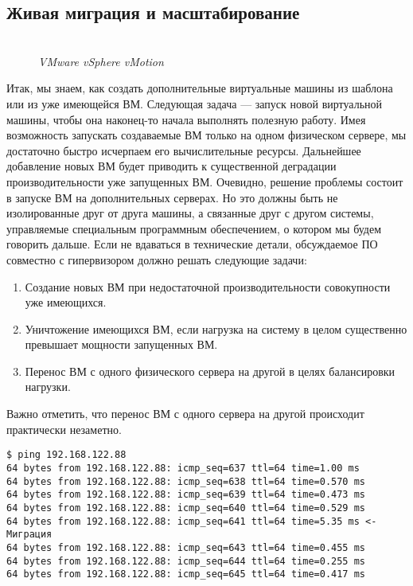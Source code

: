 \documentclass[14pt, a4paper]{article}
\begin{document}
\subsection*{Живая миграция и масштабирование} 

\begin{figure}[h]
    \centering
    \\ 
    \small\textit{VMware vSphere vMotion}  
    \label{framework} 
\end{figure}

Итак, мы знаем, как создать дополнительные виртуальные машины из шаблона или из уже
имеющейся ВМ. Следующая задача — запуск новой виртуальной машины, чтобы она наконец-то
начала выполнять полезную работу. Имея возможность запускать создаваемые ВМ только на одном
физическом сервере, мы достаточно быстро исчерпаем его вычислительные ресурсы. Дальнейшее
добавление новых ВМ будет приводить к существенной деградации производительности уже
запущенных ВМ. Очевидно, решение проблемы состоит в запуске ВМ на дополнительных серверах.
Но это должны быть не изолированные друг от друга машины, а связанные друг с другом системы,
управляемые специальным программным обеспечением, о котором мы будем говорить дальше. Если
не вдаваться в технические детали, обсуждаемое ПО совместно с гипервизором должно решать
следующие задачи:

\begin{enumerate}
    \item Создание новых ВМ при недостаточной производительности совокупности уже имеющихся.
    \item Уничтожение имеющихся ВМ, если нагрузка на систему в целом существенно превышает
    мощности запущенных ВМ.
    \item Перенос ВМ с одного физического сервера на другой в целях балансировки нагрузки.
\end{enumerate}

Важно отметить, что перенос ВМ с одного сервера на другой происходит практически незаметно.

\begin{lstlisting}
$ ping 192.168.122.88
64 bytes from 192.168.122.88: icmp_seq=637 ttl=64 time=1.00 ms
64 bytes from 192.168.122.88: icmp_seq=638 ttl=64 time=0.570 ms
64 bytes from 192.168.122.88: icmp_seq=639 ttl=64 time=0.473 ms
64 bytes from 192.168.122.88: icmp_seq=640 ttl=64 time=0.529 ms
64 bytes from 192.168.122.88: icmp_seq=641 ttl=64 time=5.35 ms <- Миграция
64 bytes from 192.168.122.88: icmp_seq=643 ttl=64 time=0.455 ms
64 bytes from 192.168.122.88: icmp_seq=644 ttl=64 time=0.255 ms
64 bytes from 192.168.122.88: icmp_seq=645 ttl=64 time=0.417 ms
\end{lstlisting}
\end{document}
